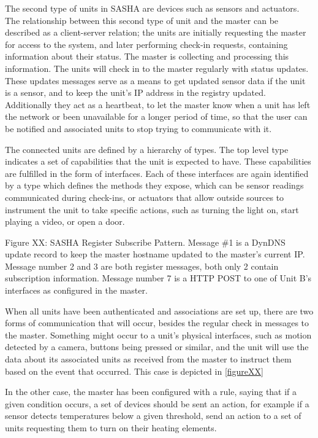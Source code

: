The second type of units in SASHA are devices such as sensors and actuators. The relationship between this second type of unit and the master can be described as a client-server relation; the units are initially requesting the master for access to the system, and later performing check-in requests, containing information about their status. The master is collecting and processing this information. The units will check in to the master regularly with status updates. These updates messages serve as a means to get updated sensor data if the unit is a sensor, and to keep the unit's IP address in the registry updated. Additionally they act as a heartbeat, to let the master know when a unit has left the network or been unavailable for a longer period of time, so that the user can be notified and associated units to stop trying to communicate with it.

The connected units are defined by a hierarchy of types. The top level type indicates a set of capabilities that the unit is expected to have. These capabilities are fulfilled in the form of interfaces. Each of these interfaces are again identified by a type which defines the methods they expose, which can be sensor readings communicated during check-ins, or actuators that allow outside sources to instrument the unit to take specific actions, such as turning the light on, start playing a video, or open a door.


Figure XX: SASHA Register Subscribe Pattern. Message \#1 is a DynDNS update record to keep the master hostname updated to the master's current IP. Message number 2 and 3 are both register messages, both only 2 contain subscription information. Message number 7 is a HTTP POST to one of Unit B's interfaces as configured in the master.

When all units have been authenticated and associations are set up, there are two forms of communication that will occur, besides the regular check in messages to the master. Something might occur to a unit's physical interfaces, such as motion detected by a camera, buttons being pressed or similar, and the unit will use the data about its associated units as received from the master to instruct them based on the event that occurred. This case is depicted in \autoref{figureXX}

In the other case, the master has been configured with a rule, saying that if a given condition occurs, a set of devices should be sent an action, for example if a sensor detects temperatures below a given threshold, send an action to a set of units requesting them to turn on their heating elements.
